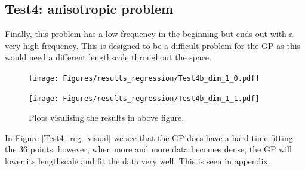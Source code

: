 \subsection{Test4: anisotropic problem}
Finally, this problem has a low frequency in the beginning but ends out with a very high frequency.
This is designed to be a difficult problem for the GP as this would need a different lengthscale
throughout the space.

\begin{figure}[H]
  \centering
  \begin{minipage}[b]{0.49\textwidth}
   \texttt{[image: Figures/results\_regression/Test4b\_dim\_1\_0.pdf]}
  \end{minipage}
  \hfill
  \begin{minipage}[b]{0.49\textwidth}
    \texttt{[image: Figures/results\_regression/Test4b\_dim\_1\_1.pdf]}
   \end{minipage}
  \caption{Plots visulising the results in above figure.}
  \label{Test4_reg_plot}
\end{figure}

In Figure \ref{Test4_reg_visual} we see that the GP does have a hard time fitting the 36 points, however, when more and more data
becomes dense, the GP will lower its lengthscale and fit the data very well. This is seen in appendix . 


